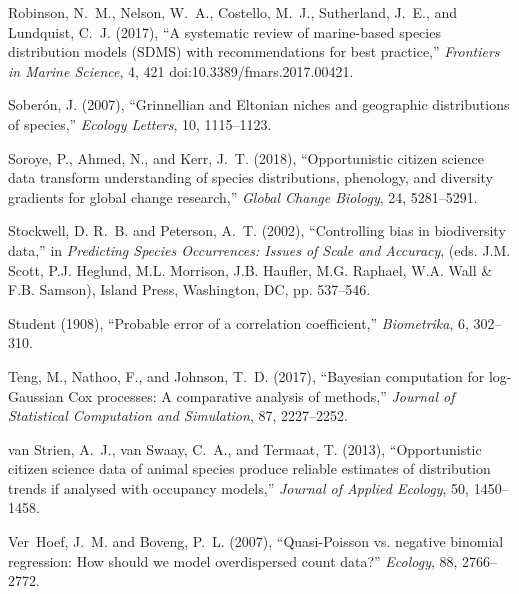 \documentclass[11pt, titlepage]{article}
\begin{document}
\begin{spacing}{1.9}
\begin{flushleft}
\begin{thebibliography}{59}
Robinson, N.~M., Nelson, W.~A., Costello, M.~J., Sutherland, J.~E., and
  Lundquist, C.~J. (2017), \enquote{A systematic review of marine-based species
  distribution models ({SDMS}) with recommendations for best practice,}
  \textit{Frontiers in Marine Science}, 4, 421 doi:10.3389/fmars.2017.00421.

Soberón, J. (2007), \enquote{Grinnellian and {Eltonian} niches and geographic
  distributions of species,} \textit{Ecology Letters}, 10, 1115--1123.

Soroye, P., Ahmed, N., and Kerr, J.~T. (2018), \enquote{Opportunistic citizen
  science data transform understanding of species distributions, phenology, and
  diversity gradients for global change research,} \textit{Global Change
  Biology}, 24, 5281--5291.

Stockwell, D. R.~B. and Peterson, A.~T. (2002), \enquote{Controlling bias in
  biodiversity data,} in \textit{Predicting {Species} {Occurrences}: {Issues}
  of {Scale} and {Accuracy}}, (eds. J.M. Scott, P.J. Heglund, M.L. Morrison,
  J.B. Haufler, M.G. Raphael, W.A. Wall \& F.B. Samson), Island Press,
  Washington, DC, pp. 537--546.

{Student} (1908), \enquote{Probable error of a correlation coefficient,}
  \textit{Biometrika}, 6, 302--310.

Teng, M., Nathoo, F., and Johnson, T.~D. (2017), \enquote{Bayesian computation
  for log-{Gaussian} {Cox} processes: {A} comparative analysis of methods,}
  \textit{Journal of Statistical Computation and Simulation}, 87, 2227--2252.

van Strien, A.~J., van Swaay, C.~A., and Termaat, T. (2013),
  \enquote{Opportunistic citizen science data of animal species produce
  reliable estimates of distribution trends if analysed with occupancy models,}
  \textit{Journal of Applied Ecology}, 50, 1450--1458.

Ver~Hoef, J.~M. and Boveng, P.~L. (2007), \enquote{Quasi-{Poisson} vs. negative
  binomial regression: {How} should we model overdispersed count data?}
  \textit{Ecology}, 88, 2766--2772.


\end{thebibliography}
\end{flushleft}
\end{spacing}
\end{document}
